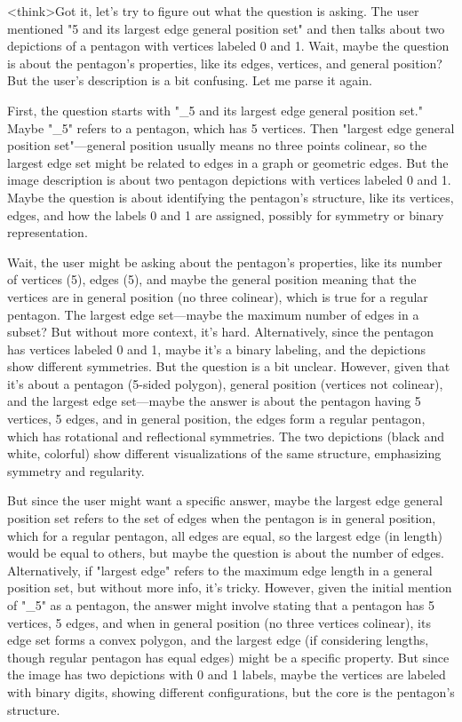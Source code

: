 <think>Got it, let's try to figure out what the question is asking. The user mentioned "5 and its largest edge general position set" and then talks about two depictions of a pentagon with vertices labeled 0 and 1. Wait, maybe the question is about the pentagon's properties, like its edges, vertices, and general position? But the user's description is a bit confusing. Let me parse it again.

First, the question starts with "_5 and its largest edge general position set." Maybe "_5" refers to a pentagon, which has 5 vertices. Then "largest edge general position set"—general position usually means no three points colinear, so the largest edge set might be related to edges in a graph or geometric edges. But the image description is about two pentagon depictions with vertices labeled 0 and 1. Maybe the question is about identifying the pentagon's structure, like its vertices, edges, and how the labels 0 and 1 are assigned, possibly for symmetry or binary representation.

Wait, the user might be asking about the pentagon's properties, like its number of vertices (5), edges (5), and maybe the general position meaning that the vertices are in general position (no three colinear), which is true for a regular pentagon. The largest edge set—maybe the maximum number of edges in a subset? But without more context, it's hard. Alternatively, since the pentagon has vertices labeled 0 and 1, maybe it's a binary labeling, and the depictions show different symmetries. But the question is a bit unclear. However, given that it's about a pentagon (5-sided polygon), general position (vertices not colinear), and the largest edge set—maybe the answer is about the pentagon having 5 vertices, 5 edges, and in general position, the edges form a regular pentagon, which has rotational and reflectional symmetries. The two depictions (black and white, colorful) show different visualizations of the same structure, emphasizing symmetry and regularity.

But since the user might want a specific answer, maybe the largest edge general position set refers to the set of edges when the pentagon is in general position, which for a regular pentagon, all edges are equal, so the largest edge (in length) would be equal to others, but maybe the question is about the number of edges. Alternatively, if "largest edge" refers to the maximum edge length in a general position set, but without more info, it's tricky. However, given the initial mention of "_5" as a pentagon, the answer might involve stating that a pentagon has 5 vertices, 5 edges, and when in general position (no three vertices colinear), its edge set forms a convex polygon, and the largest edge (if considering lengths, though regular pentagon has equal edges) might be a specific property. But since the image has two depictions with 0 and 1 labels, maybe the vertices are labeled with binary digits, showing different configurations, but the core is the pentagon's structure.

